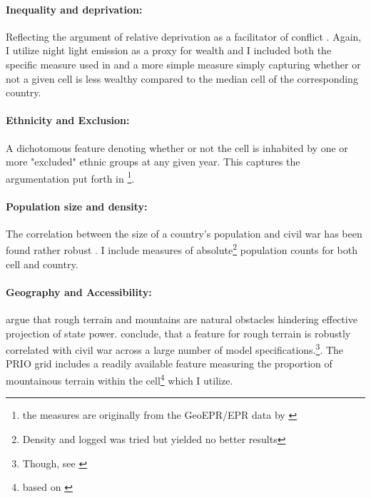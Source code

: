 \documentclass[a4paper]{article}
\begin{document}
\paragraph{Inequality and deprivation:} Reflecting the argument of relative deprivation as a facilitator of conflict \citep{Gurr_1970, Cederman_Gleditsch_Buhaug_2013}. Again, I utilize night light emission as a proxy for wealth and I included both the specific measure used in \cite{Cederman_Gleditsch_Buhaug_2013} and a more simple measure simply capturing whether or not a given cell is less wealthy compared to the median cell of the corresponding country.\par

\paragraph{Ethnicity and Exclusion:} A dichotomous feature denoting whether or not the cell is inhabited by one or more "excluded" ethnic groups at any given year. This captures the argumentation put forth in \cite{Cederman_Weidmann_Gleditsch_2011, Cederman_Gleditsch_Buhaug_2013}\footnote{the measures are originally from the GeoEPR/EPR data by \cite{Vogt_2015}}.\par

\paragraph{Population size and density:} The correlation between the size of a country's population and civil war has been found rather robust \citep{Collier_Hoeffler_1998, Fearon_Laitin_2003, Fearon_2004, Collier_Hoeffler_2004, Hegre_Sambanis_2006}. I include measures of absolute\footnote{Density and logged was tried but yielded no better results} population counts for both cell and country.\par 

\paragraph{Geography and Accessibility:} \cite{Fearon_Laitin_2003} argue that rough terrain and mountains are natural obstacles hindering effective projection of state power. \cite{Hegre_Sambanis_2006} conclude, that a feature for rough terrain is robustly correlated with civil war across a large number of model specifications.\cite[526-529]{Hegre_Sambanis_2006}\footnote{Though, see \cite{Goldstone_2010}}. The PRIO grid includes a readily available feature measuring the proportion of mountainous terrain within the cell\footnote{based on \cite{Blyth_2002}} which I utilize.\par
\end{document}
